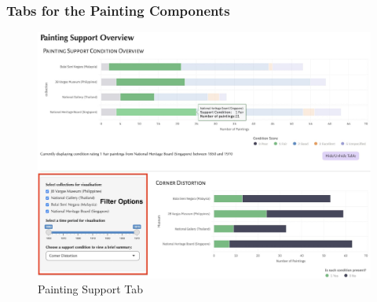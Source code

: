 \documentclass[11pt, oneside]{article}
\begin{document}
\subsubsection{Tabs for the Painting Components}
\begin{figure}[H]
    \centering
    \includegraphics[scale=0.23]{images/ps_tab.jpeg}
    \caption{Painting Support Tab}
    \label{ps_tab}
\end{figure}
\end{document}
